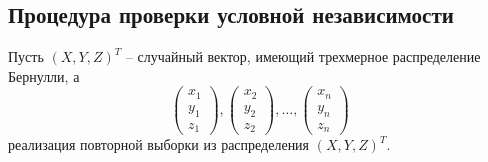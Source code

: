 \subsection{Процедура проверки условной независимости}

Пусть $(X,Y,Z)^T$ -- случайный вектор, имеющий трехмерное распределение
Бернулли, а
$$
\begin{pmatrix}
        x_1 \\
        y_1 \\
        z_1
    \end{pmatrix},
    \begin{pmatrix}
        x_2 \\
        y_2 \\
        z_2
    \end{pmatrix}, \ldots,
    \begin{pmatrix}
        x_n \\
        y_n \\
        z_n
    \end{pmatrix}
$$ реализация повторной выборки из распределения $(X,Y,Z)^T$.


